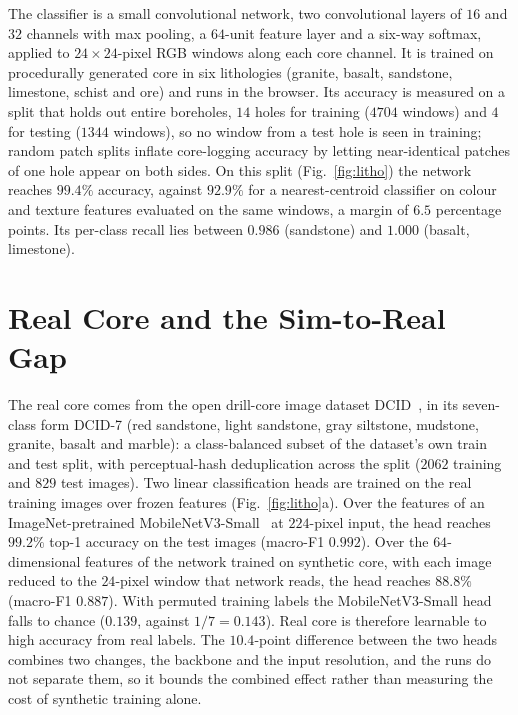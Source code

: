 \documentclass[journal]{IEEEtran}
\begin{document}
The classifier is a small convolutional network, two convolutional layers of $16$ and $32$ channels with max
pooling, a $64$-unit feature layer and a six-way softmax, applied to $24\times24$-pixel RGB windows along each core
channel. It is trained on procedurally generated core in six lithologies (granite, basalt, sandstone, limestone,
schist and ore) and runs in the browser. Its accuracy is measured on a split that holds out entire boreholes, $14$
holes for training ($4704$ windows) and $4$ for testing ($1344$ windows), so no window from a test hole is seen in
training; random patch splits inflate core-logging accuracy by letting near-identical patches of one hole appear on
both sides. On this split (Fig.~\ref{fig:litho}) the network reaches $99.4\%$ accuracy, against $92.9\%$ for a
nearest-centroid classifier on colour and texture features evaluated on the same windows, a margin of $6.5$
percentage points. Its per-class recall lies between $0.986$ (sandstone) and $1.000$ (basalt, limestone).

\section{Real Core and the Sim-to-Real Gap}\label{sec:real}

The real core comes from the open drill-core image dataset DCID~\cite{dcid}, in its seven-class form DCID-7 (red
sandstone, light sandstone, gray siltstone, mudstone, granite, basalt and marble): a class-balanced subset of the
dataset's own train and test split, with perceptual-hash deduplication across the split ($2062$ training and $829$
test images). Two linear
classification heads are trained on the real training images over frozen features (Fig.~\ref{fig:litho}a). Over the
features of an ImageNet-pretrained MobileNetV3-Small~\cite{howard} at $224$-pixel input, the head reaches $99.2\%$
top-1 accuracy on the test images (macro-F1 $0.992$). Over the $64$-dimensional features of the network trained on
synthetic core, with each image reduced to the $24$-pixel window that network reads, the head reaches $88.8\%$
(macro-F1 $0.887$). With permuted training labels the MobileNetV3-Small head falls to chance ($0.139$, against
$1/7=0.143$). Real core is
therefore learnable to high accuracy from real labels. The $10.4$-point difference between the two heads combines
two changes, the backbone and the input resolution, and the runs do not separate them, so it bounds the combined
effect rather than measuring the cost of synthetic training alone.
\end{document}
